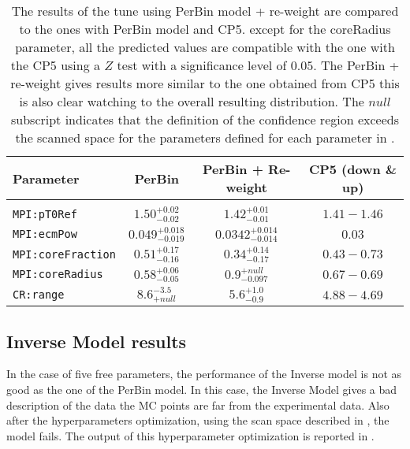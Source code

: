 \begin{table}[!htb]
\centering
	\begin{tabular}{l | c | c | c }
		Parameter & PerBin & PerBin + Re-weight & CP5 (down \& up)\\ \hline\hline
		\\[-0.85em]		
\texttt{MPI:pT0Ref} & $ 1.50^{+0.02}_{-0.02}$ & $ 1.42_{-0.01}^{+0.01} $ & $1.41 - 1.46$\\[3pt]
\texttt{MPI:ecmPow} & $ 0.049_{-0.019}^{+0.018} $ & $ 0.0342_{-0.014}^{+0.014} $ & $0.03$\\[3pt]
\texttt{MPI:coreFraction} & $ 0.51_{-0.16}^{+0.17} $ & $ 0.34_{-0.17}^{+0.14} $ & $0.43 - 0.73$\\[3pt]
\texttt{MPI:coreRadius} & $ 0.58_{-0.05}^{+0.06} $ & $ 0.9_{-0.097}^{+null} $ & $0.67 - 0.69$\\[3pt]
\texttt{CR:range} & $ 8.6 ^{-3.5}_{+null} $ & $ 5.6_{-0.9}^{+1.0} $ & $4.88 - 4.69$\\[2pt]
\end{tabular}
\caption{The results of the tune using PerBin model + re-weight are compared to the ones with PerBin model and CP5. except for the coreRadius parameter, all the predicted values are compatible with the one with the CP5 using a $Z$ test with a significance level of $0.05$. The PerBin + re-weight gives results more similar to the one obtained from CP5 this is also clear watching to the overall resulting distribution. The $null$ subscript indicates that the definition of the confidence region exceeds the scanned space for the parameters defined for each parameter in .}
\label{table:result_PerBin_5params_rew}
\end{table}

\clearpage
\subsection{Inverse Model results}

In the case of five free parameters, the performance of the Inverse model is not as good as the one of the PerBin model.
In this case, the Inverse Model gives a bad description of the data the MC points are far from the experimental data. Also after the hyperparameters optimization, using the scan space described in , the model fails. The output of this hyperparameter optimization is reported in .

